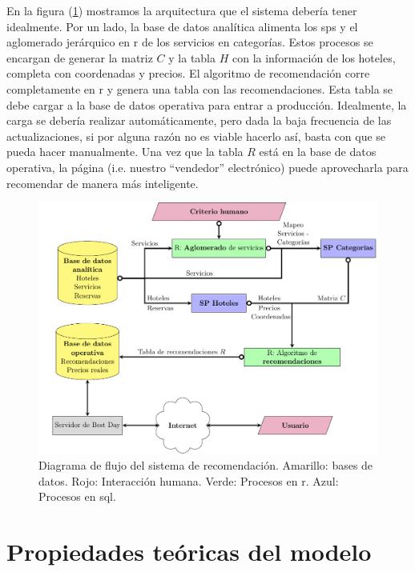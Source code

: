 \documentclass[12pt]{report}
\begin{document}
En la figura (\ref{fig:flujo}) mostramos la arquitectura que el sistema debería tener idealmente. Por un lado, la base de datos analítica alimenta los \glspl{sp} y el aglomerado jerárquico en \gls{r} de los servicios en categorías. Estos procesos se encargan de generar la matriz $C$ y la tabla $H$ con la información de los hoteles, completa con coordenadas y precios. El algoritmo de recomendación corre completamente en \gls{r} y genera una tabla con las recomendaciones. Esta tabla se debe cargar a la base de datos operativa para entrar a producción. Idealmente, la carga se debería realizar automáticamente, pero dada la baja frecuencia de las actualizaciones, si por alguna razón no es viable hacerlo así, basta con que se pueda hacer manualmente. Una vez que la tabla $R$ está en la base de datos operativa, la página (i.e. nuestro ``vendedor'' electrónico) puede aprovecharla para recomendar de manera más inteligente.

\begin{figure}[ht]
	\centering
	\includegraphics[width=\textwidth]{imagenes/flowchart.pdf}
	\caption{\label{fig:flujo} Diagrama de flujo del sistema de recomendación. Amarillo: bases de datos. Rojo: Interacción humana. Verde: Procesos en \gls{r}. Azul: Procesos en \gls{sql}.}
\end{figure}


\chapter{Propiedades teóricas del modelo} \label{cap:4}
\end{document}
